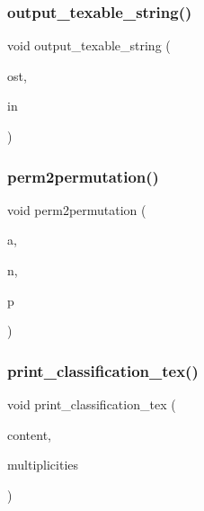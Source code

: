 \mbox{\label{global_8_c_a737bc3e2b6cb687ad975c30bb8cc9d75}} 
\subsubsection{\texorpdfstring{output\+\_\+texable\+\_\+string()}{output\_texable\_string()}}
{\footnotesize\ttfamily void output\+\_\+texable\+\_\+string (\begin{DoxyParamCaption}\item[{ostream \&}]{ost,  }\item[{char $\ast$}]{in }\end{DoxyParamCaption})}

\mbox{\label{global_8_c_ad063a496206583f8db8cd8c31e2cc536}} 
\subsubsection{\texorpdfstring{perm2permutation()}{perm2permutation()}}
{\footnotesize\ttfamily void perm2permutation (\begin{DoxyParamCaption}\item[{\mbox{\hyperlink{galois_8h_a09fddde158a3a20bd2dcadb609de11dc}{I\+NT}} $\ast$}]{a,  }\item[{\mbox{\hyperlink{galois_8h_a09fddde158a3a20bd2dcadb609de11dc}{I\+NT}}}]{n,  }\item[{\mbox{\hyperlink{classpermutation}{permutation}} \&}]{p }\end{DoxyParamCaption})}

\mbox{\label{global_8_c_aefba9d715816fdc37563d5e6b16b25e9}} 
\subsubsection{\texorpdfstring{print\+\_\+classification\+\_\+tex()}{print\_classification\_tex()}\hspace{0.1cm}{\footnotesize\ttfamily [1/2]}}
{\footnotesize\ttfamily void print\+\_\+classification\+\_\+tex (\begin{DoxyParamCaption}\item[{\mbox{\hyperlink{class_vector}{Vector}} \&}]{content,  }\item[{\mbox{\hyperlink{class_vector}{Vector}} \&}]{multiplicities }\end{DoxyParamCaption})}

